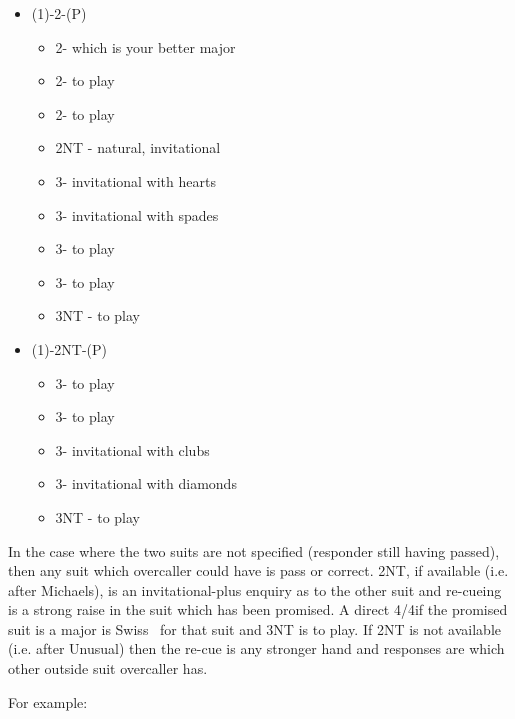 \documentclass[a4paper,14pt]{extarticle}
\begin{document}
\begin{itemize}
\item (1\clubs)-2\clubs-(P)
	\begin{itemize}
	\item 2\diamonds - which is your better major
	\item 2\hearts - to play
	\item 2\spades - to play
	\item 2NT - natural, invitational
	\item 3\clubs - invitational with hearts
	\item 3\diamonds - invitational with spades
	\item 3\hearts - to play
	\item 3\spades - to play
	\item 3NT - to play
	\end{itemize}
\item (1\hearts)-2NT-(P)
	\begin{itemize}
	\item 3\clubs - to play
	\item 3\diamonds - to play
	\item 3\hearts - invitational with clubs
	\item 3\spades - invitational with diamonds
	\item 3NT - to play
	\end{itemize}
\end{itemize}

In the case where the two suits are not specified (responder still having
		passed), then any suit which overcaller could have is pass or correct.
2NT, if available (i.e. after Michaels), is an invitational-plus enquiry as to
the other suit and re-cueing is a strong raise in the suit which has been
promised. A direct 4\clubs/4\diamonds if the promised suit is a major
is Swiss~ for that suit and 3NT is to play. If 2NT is not
available (i.e. after Unusual) then the re-cue is any stronger hand and
responses are which other outside suit overcaller has.

\newpage

For example:
\end{document}
